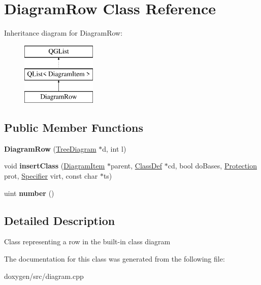 \hypertarget{class_diagram_row}{}\section{Diagram\+Row Class Reference}
\label{class_diagram_row}
Inheritance diagram for Diagram\+Row\+:\begin{figure}[H]
\begin{center}
\leavevmode
\includegraphics[height=3.000000cm]{class_diagram_row}
\end{center}
\end{figure}
\subsection*{Public Member Functions}
\begin{DoxyCompactItemize}
\item 
\mbox{\label{class_diagram_row_aebadc42ab37dd863cf4eb4ee6c5914a3}} 
{\bfseries Diagram\+Row} (\mbox{\hyperlink{class_tree_diagram}{Tree\+Diagram}} $\ast$d, int l)
\item 
\mbox{\label{class_diagram_row_ab0e8fb24c44ac7ff3acedae9fc92674b}} 
void {\bfseries insert\+Class} (\mbox{\hyperlink{class_diagram_item}{Diagram\+Item}} $\ast$parent, \mbox{\hyperlink{class_class_def}{Class\+Def}} $\ast$cd, bool do\+Bases, \mbox{\hyperlink{types_8h_a90e352184df58cd09455fe9996cd4ded}{Protection}} prot, \mbox{\hyperlink{types_8h_ab16236bdd10ddf4d73a9847350f0017e}{Specifier}} virt, const char $\ast$ts)
\item 
\mbox{\label{class_diagram_row_ad6dbe8c970dc8658a99fa400430758d2}} 
uint {\bfseries number} ()
\end{DoxyCompactItemize}


\subsection{Detailed Description}
Class representing a row in the built-\/in class diagram 

The documentation for this class was generated from the following file\+:\begin{DoxyCompactItemize}
\item 
doxygen/src/diagram.\+cpp\end{DoxyCompactItemize}
